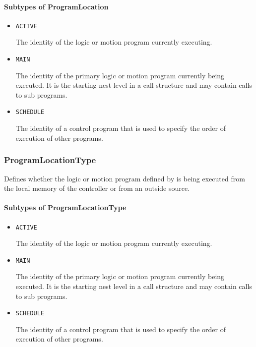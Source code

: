 \paragraph{Subtypes of ProgramLocation}\mbox{}
\label{sec:Subtypes of ProgramLocation}

\begin{itemize}

\item \texttt{ACTIVE}


The identity of the logic or motion program currently executing.

\item \texttt{MAIN}


The identity of the primary logic or motion program currently being executed. It is the starting nest level in a call structure and may contain calls to sub programs.

\item \texttt{SCHEDULE}


The identity of a control program that is used to specify the order of execution of other programs.


\end{itemize}






\subsubsection{ProgramLocationType}
\label{sec:ProgramLocationType}



Defines whether the logic or motion program defined by  is being executed from the local memory of the controller or from an outside source.



\paragraph{Subtypes of ProgramLocationType}\mbox{}
\label{sec:Subtypes of ProgramLocationType}

\begin{itemize}

\item \texttt{ACTIVE}


The identity of the logic or motion program currently executing.

\item \texttt{MAIN}


The identity of the primary logic or motion program currently being executed. It is the starting nest level in a call structure and may contain calls to sub programs.

\item \texttt{SCHEDULE}


The identity of a control program that is used to specify the order of execution of other programs.


\end{itemize}






